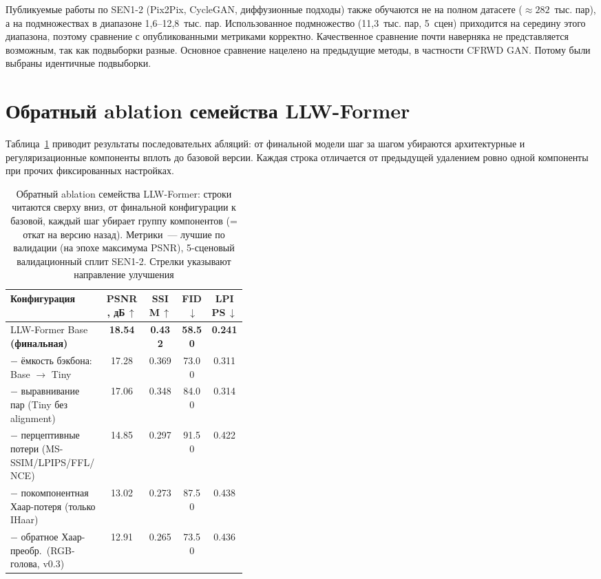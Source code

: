 Публикуемые работы по SEN1-2 (Pix2Pix, CycleGAN, диффузионные подходы) также обучаются
не на полном датасете ($\approx 282$~тыс. пар), а на подмножествах в диапазоне
1,6--12,8~тыс. пар. Использованное подмножество (11,3~тыс. пар, 5~сцен) приходится
на середину этого диапазона, поэтому сравнение с опубликованными метриками корректно.
Качественное сравнение почти наверняка не представляется возможным, так как подвыборки разные.
Основное сравнение нацелено на предыдущие методы, в частности CFRWD GAN. Потому были выбраны идентичные подвыборки.

\section{Обратный ablation семейства LLW-Former}
\label{sec:ablation}

Таблица~\ref{tab:ablation} приводит результаты последовательнх абляций: от
финальной модели шаг за шагом убираются архитектурные и регуляризационные
компоненты вплоть до базовой версии. Каждая строка отличается от предыдущей
удалением ровно одной компоненты при прочих фиксированных настройках.

\begin{table}[H]
  \caption{Обратный ablation семейства LLW-Former: строки читаются сверху вниз, от
           финальной конфигурации к базовой, каждый шаг убирает группу
           компонентов (= откат на версию назад). Метрики~--- лучшие по
           валидации (на эпохе максимума PSNR), 5-сценовый валидационный сплит
           SEN1-2. Стрелки указывают направление улучшения}
  \label{tab:ablation}
  \centering
  \small
  \begin{tabular}{p{0.40\linewidth}cccc}
    \toprule
    Конфигурация & PSNR, дБ\,$\uparrow$ & SSIM\,$\uparrow$ & FID\,$\downarrow$ & LPIPS\,$\downarrow$ \\
    \midrule
    LLW-Former Base \textbf{(финальная)}              & \textbf{18.54} & \textbf{0.432} & \textbf{58.50} & \textbf{0.241} \\
    \;\;$-$ ёмкость бэкбона: Base $\to$ Tiny           & 17.28 & 0.369 & 73.00 & 0.311 \\
    \;\;$-$ выравнивание пар (Tiny без alignment)      & 17.06 & 0.348 & 84.00 & 0.314 \\
    \;\;$-$ перцептивные потери (MS-SSIM/LPIPS/FFL/NCE)& 14.85 & 0.297 & 91.50 & 0.422 \\
    \;\;$-$ покомпонентная Хаар-потеря (только IHaar)  & 13.02 & 0.273 & 87.50 & 0.438 \\
    \;\;$-$ обратное Хаар-преобр.\ (RGB-голова, v0.3)  & 12.91 & 0.265 & 73.50 & 0.436 \\
    \bottomrule
  \end{tabular}
\end{table}

